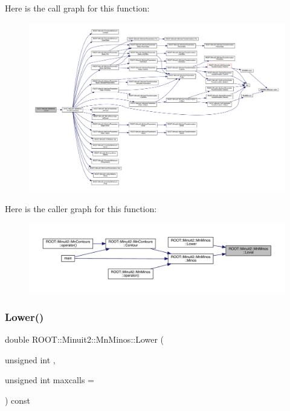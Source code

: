 Here is the call graph for this function\+:\nopagebreak
\begin{figure}[H]
\begin{center}
\leavevmode
\includegraphics[width=350pt]{dc/d91/classROOT_1_1Minuit2_1_1MnMinos_a708381f90e4bd9118dec60726a1bdf73_cgraph}
\end{center}
\end{figure}
Here is the caller graph for this function\+:\nopagebreak
\begin{figure}[H]
\begin{center}
\leavevmode
\includegraphics[width=350pt]{dc/d91/classROOT_1_1Minuit2_1_1MnMinos_a708381f90e4bd9118dec60726a1bdf73_icgraph}
\end{center}
\end{figure}
\mbox{\label{classROOT_1_1Minuit2_1_1MnMinos_a0e6c6ab67bdd7b3461d900f64b4908ba}} 
\subsubsection{\texorpdfstring{Lower()}{Lower()}\hspace{0.1cm}{\footnotesize\ttfamily [1/2]}}
{\footnotesize\ttfamily double R\+O\+O\+T\+::\+Minuit2\+::\+Mn\+Minos\+::\+Lower (\begin{DoxyParamCaption}\item[{unsigned int}]{,  }\item[{unsigned int}]{maxcalls = {} }\end{DoxyParamCaption}) const}



